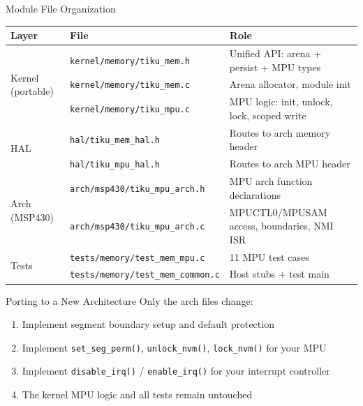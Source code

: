 \documentclass[aspectratio=169, 10pt]{beamer}
\begin{document}
\begin{frame}[fragile]{Module File Organization}
\begin{table}
\centering
\small
\begin{tabular}{@{}lll@{}}
\toprule
\textbf{Layer} & \textbf{File} & \textbf{Role} \\
\midrule
\multirow{3}{*}{Kernel (portable)}
  & \texttt{kernel/memory/tiku\_mem.h}  & Unified API: arena + persist + MPU types \\
  & \texttt{kernel/memory/tiku\_mem.c}  & Arena allocator, module init \\
  & \texttt{kernel/memory/tiku\_mpu.c}  & MPU logic: init, unlock, lock, scoped write \\
\midrule
\multirow{2}{*}{HAL}
  & \texttt{hal/tiku\_mem\_hal.h}  & Routes to arch memory header \\
  & \texttt{hal/tiku\_mpu\_hal.h}  & Routes to arch MPU header \\
\midrule
\multirow{2}{*}{Arch (MSP430)}
  & \texttt{arch/msp430/tiku\_mpu\_arch.h} & MPU arch function declarations \\
  & \texttt{arch/msp430/tiku\_mpu\_arch.c} & MPUCTL0/MPUSAM access, boundaries, NMI ISR \\
\midrule
\multirow{2}{*}{Tests}
  & \texttt{tests/memory/test\_mem\_mpu.c}    & 11 MPU test cases \\
  & \texttt{tests/memory/test\_mem\_common.c} & Host stubs + test main \\
\bottomrule
\end{tabular}
\end{table}

\vspace{0.5em}
\begin{block}{Porting to a New Architecture}
Only the arch files change:
\begin{enumerate}
  \item Implement segment boundary setup and default protection
  \item Implement \texttt{set\_seg\_perm()}, \texttt{unlock\_nvm()}, \texttt{lock\_nvm()} for your MPU
  \item Implement \texttt{disable\_irq()} / \texttt{enable\_irq()} for your interrupt controller
  \item The kernel MPU logic and all tests remain untouched
\end{enumerate}
\end{block}
\end{frame}
\end{document}
